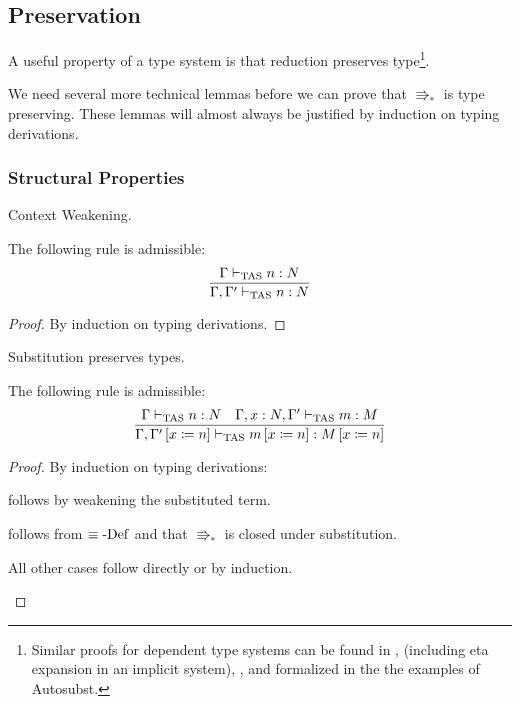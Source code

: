 \subsection{Preservation}
 
A useful property of a type system is that reduction preserves type\footnote{
  Similar proofs for dependent type systems can be found in \cite[Chapter 3]{luo1994computation}, \cite[Section 3.1]{10.1007/3-540-45413-6_27}(including eta expansion in an implicit system), \cite[appendix]{sjoberg2012irrelevance}, and formalized in the the examples of Autosubst\cite{SchaeferEtAl:2015:Autosubst:-Reasoning}.
}.
 
We need several more technical lemmas before we can prove that $\Rrightarrow_{\ast}$ is type preserving.
These lemmas will almost always be justified by induction on typing derivations.
 
\subsubsection{Structural Properties}
 
\begin{thm} Context Weakening.
 
The following rule is admissible:
\[
\frac{\Gamma\vdash_{\mathrm{TAS}} n:N}{\Gamma,\Gamma'\vdash_{\mathrm{TAS}} n:N}
\]
\end{thm}
\begin{proof}
By induction on typing derivations.
\end{proof}

\begin{lem} Substitution preserves types.
 
The following rule is admissible: %
\[
\frac{\Gamma\vdash_{\mathrm{TAS}} n:N\quad\Gamma,x:N,\Gamma'\vdash_{\mathrm{TAS}} m:M}{\Gamma,\Gamma'\left[x\coloneqq n\right]\vdash_{\mathrm{TAS}} m\left[x\coloneqq n\right]:M\left[x\coloneqq n\right]}
\]
\end{lem}
\begin{proof}
By induction on typing derivations:
\begin{casenv}
 \item {} follows by weakening the substituted term.
 \item {} follows from $\equiv\operatorname{-Def}$ and that $\Rrightarrow_{\ast}$ is closed under substitution.
 \item All other cases follow directly or by induction.
\end{casenv}
\end{proof}

